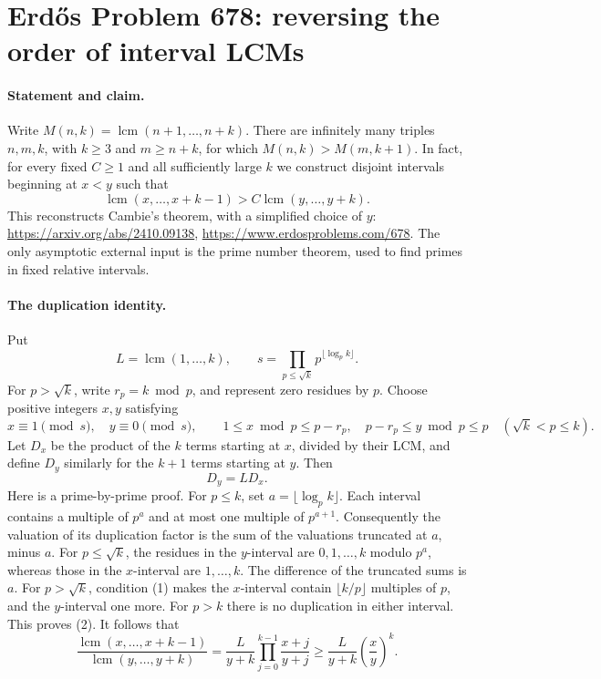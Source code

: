 \section*{Erd\H{o}s Problem 678: reversing the order of interval LCMs}

\paragraph{Statement and claim.}
Write \(M(n,k)=\operatorname{lcm}(n+1,\ldots,n+k)\).
There are infinitely many triples \(n,m,k\), with \(k\geq3\) and
\(m\geq n+k\), for which \(M(n,k)>M(m,k+1)\).
In fact, for every fixed \(C\geq1\) and all sufficiently large \(k\)
we construct disjoint intervals beginning at \(x<y\) such that
\[
 \operatorname{lcm}(x,\ldots,x+k-1)>
 C\operatorname{lcm}(y,\ldots,y+k).
\]
This reconstructs Cambie's theorem, with a simplified choice of \(y\):
\url{https://arxiv.org/abs/2410.09138},
\url{https://www.erdosproblems.com/678}.
The only asymptotic external input is the prime number theorem, used
to find primes in fixed relative intervals.

\paragraph{The duplication identity.}
Put
\[
 L=\operatorname{lcm}(1,\ldots,k),\qquad
 s=\prod_{p\leq\sqrt{k}}p^{\lfloor\log_p k\rfloor}.
\]
For \(p>\sqrt{k}\), write \(r_p=k\bmod p\), and represent zero
residues by \(p\). Choose positive integers \(x,y\) satisfying
\[
 x\equiv1\pmod s,\quad y\equiv0\pmod s,\qquad
 1\leq x\bmod p\leq p-r_p,\quad
 p-r_p\leq y\bmod p\leq p
 \quad(\sqrt{k}<p\leq k).
                                                               \tag{1}
\]
Let \(D_x\) be the product of the \(k\) terms starting at \(x\),
divided by their LCM, and define \(D_y\) similarly for the \(k+1\)
terms starting at \(y\). Then
\[
 D_y=L D_x.                                                     \tag{2}
\]
Here is a prime-by-prime proof. For \(p\leq k\), set
\(a=\lfloor\log_p k\rfloor\). Each interval contains a multiple
of \(p^a\) and at most one multiple of \(p^{a+1}\). Consequently
the valuation of its duplication factor is the sum of the
valuations truncated at \(a\), minus \(a\).
For \(p\leq\sqrt{k}\), the residues in the \(y\)-interval are
\(0,1,\ldots,k\) modulo \(p^a\), whereas those in the \(x\)-interval
are \(1,\ldots,k\). The difference of the truncated sums is \(a\).
For \(p>\sqrt{k}\), condition (1) makes the \(x\)-interval contain
\(\lfloor k/p\rfloor\) multiples of \(p\), and the \(y\)-interval
one more. For \(p>k\) there is no duplication in either interval.
This proves (2). It follows that
\[
 \frac{\operatorname{lcm}(x,\ldots,x+k-1)}
      {\operatorname{lcm}(y,\ldots,y+k)}
 =\frac L{y+k}\prod_{j=0}^{k-1}\frac{x+j}{y+j}
 \geq \frac L{y+k}\left(\frac xy\right)^k.                       \tag{3}
\]

